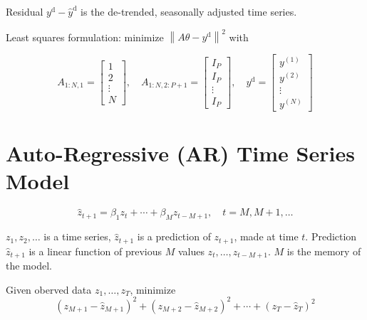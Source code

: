 \begin{definition}
    Residual $ y^{\mathrm{d}}-\hat{y}^{\mathrm{d}} $ is the de-trended, seasonally adjusted time series.
\end{definition}

\begin{problem}
    Least squares formulation: minimize $ \left\|A \theta-y^{\mathrm{d}}\right\|^{2} $ with

$$ A_{1: N, 1}=\left[\begin{array}{c}1 \\ 2 \\ \vdots \\ N\end{array}\right], \quad A_{1: N, 2: P+1}=\left[\begin{array}{c}I_{P} \\ I_{P} \\ \vdots \\ I_{P}\end{array}\right], \quad y^{\mathrm{d}}=\left[\begin{array}{c}y^{(1)} \\ y^{(2)} \\ \vdots \\ y^{(N)}\end{array}\right] $$
\end{problem}



\section{Auto-Regressive (AR) Time Series Model}

\begin{problem}
    $$
\hat{z}_{t+1}=\beta_{1} z_{t}+\cdots+\beta_{M} z_{t-M+1}, \quad t=M, M+1, \ldots
$$

$ z_{1}, z_{2}, \ldots $ is a time series, $ \hat{z}_{t+1} $ is a prediction of $ z_{t+1} $, made at time $ t $. Prediction $ \hat{z}_{t+1} $ is a linear function of previous $ M $ values $ z_{t}, \ldots, z_{t-M+1} $. $ M $ is the memory of the model.
\end{problem}

\begin{problem}
    
    Given oberved data $ z_{1}, \ldots, z_{T} $, minimize
$$
\left(z_{M+1}-\hat{z}_{M+1}\right)^{2}+\left(z_{M+2}-\hat{z}_{M+2}\right)^{2}+\cdots+\left(z_{T}-\hat{z}_{T}\right)^{2}
$$
\end{problem}


